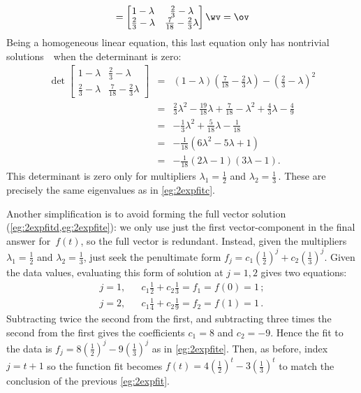 \begin{example}
\begin{solution}
\begin{equation*}
=\begin{bmatrix} 1-\lambda&\frac23-\lambda\\\frac23-\lambda&\frac7{18}-\frac23\lambda \end{bmatrix}\wv
=\ov
\end{equation*}
Being a homogeneous linear equation, this last equation only has nontrivial solutions~\wv\ when the determinant is zero:
\begin{eqnarray*}
\det\begin{bmatrix} 1-\lambda&\tfrac23-\lambda\\\tfrac23-\lambda&\frac7{18}-\tfrac23\lambda\end{bmatrix}
&=&(1-\lambda)(\tfrac7{18}-\tfrac23\lambda)-(\tfrac23-\lambda)^2
\\&=&\tfrac23\lambda^2-\tfrac{19}{18}\lambda+\tfrac7{18}
-\lambda^2+\tfrac43\lambda-\tfrac49
\\&=&-\tfrac13\lambda^2+\tfrac5{18}\lambda-\tfrac1{18}
\\&=&-\tfrac1{18}(6\lambda^2-5\lambda+1)
\\&=&-\tfrac1{18}(2\lambda-1)(3\lambda-1).
\end{eqnarray*}
This determinant is zero only for multipliers \(\lambda_1=\tfrac12\) and \(\lambda_2=\tfrac13\)\,. 
These are precisely the same eigenvalues as in \cref{eg:2expfitc}.

Another simplification is to avoid forming the full vector solution (\cref{eg:2expfitd,eg:2expfite}):
we only use just the first vector-component in the final answer for~\(f(t)\), so the full vector is redundant.
Instead, given the multipliers \(\lambda_1=\tfrac12\) and \(\lambda_2=\tfrac13\), just seek the penultimate form \(f_j=c_1(\tfrac12)^j+c_2(\tfrac13)^j\).
Given the data values, evaluating this form of solution at \(j=1,2\) gives two equations:
\begin{eqnarray*}
j=1,&&c_1\tfrac12+c_2\tfrac13=f_1=f(0)=1\,;
\\
j=2,&&c_1\tfrac14+c_2\tfrac19=f_2=f(1)=1\,.
\end{eqnarray*}
Subtracting twice the second from the first, and subtracting three times the second from the first gives the coefficients \(c_1=8\) and \(c_2=-9\).
Hence the fit to the data is \(f_j=8(\frac12)^j -9(\frac13)^j\) as in \cref{eg:2expfite}.
Then, as before, index \(j=t+1\) so the function fit becomes \(f(t)=4(\frac12)^{t} -3(\frac13)^{t}\) to match the conclusion of the previous \cref{eg:2expfit}.
\end{solution}
\end{example}




